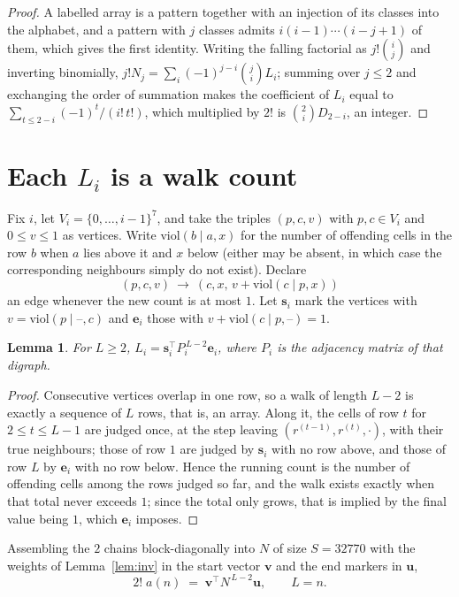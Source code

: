 \documentclass[11pt,a4paper]{article}
\theoremstyle{plain}
\newtheorem{lemma}[theorem]{Lemma}
\theoremstyle{definition}
\begin{document}
\begin{proof}
A labelled array is a pattern together with an injection of its classes into the alphabet,
and a pattern with $j$ classes admits $i(i-1)\cdots(i-j+1)$ of them, which gives the first
identity. Writing the falling factorial as $j!\binom{i}{j}$ and inverting binomially,
$j!N_j=\sum_i(-1)^{j-i}\binom{j}{i}L_i$; summing over $j\le2$ and exchanging the
order of summation makes the coefficient of $L_i$ equal to
$\sum_{t\le2-i}(-1)^t/(i!\,t!)$, which multiplied by $2!$ is
$\binom{2}{i}D_{2-i}$, an integer.
\end{proof}

\section{Each $L_i$ is a walk count}

Fix $i$, let $V_i=\{0,\dots,i-1\}^{7}$, and take the triples $(p,c,v)$ with
$p,c\in V_i$ and $0\le v\le1$ as vertices. Write $\mathrm{viol}(b\mid a,x)$ for the number
of offending cells in the row $b$ when $a$ lies above it and $x$ below (either may be
absent, in which case the corresponding neighbours simply do not exist). Declare
\[
(p,c,v)\ \longrightarrow\ (c,x,\,v+\mathrm{viol}(c\mid p,x))
\]
an edge whenever the new count is at most $1$. Let $\mathbf{s}_i$ mark the vertices with
$v=\mathrm{viol}(p\mid\text{--},c)$ and $\mathbf{e}_i$ those with
$v+\mathrm{viol}(c\mid p,\text{--})=1$.

\begin{lemma}\label{lem:walk}
For $L\ge2$, $L_i=\mathbf{s}_i^{\!\top}P_i^{\,L-2}\mathbf{e}_i$, where $P_i$ is the
adjacency matrix of that digraph.
\end{lemma}

\begin{proof}
Consecutive vertices overlap in one row, so a walk of length $L-2$ is exactly a sequence
of $L$ rows, that is, an array. Along it, the cells of row $t$ for $2\le t\le L-1$ are
judged once, at the step leaving $(r^{(t-1)},r^{(t)},\cdot)$, with their true neighbours;
those of row $1$ are judged by $\mathbf{s}_i$ with no row above, and those of row
$L$ by $\mathbf{e}_i$ with no row below. Hence the running count is the number of
offending cells among the rows judged so far, and the walk exists exactly when that total
never exceeds $1$; since the total only grows, that is implied by the final value being
$1$, which $\mathbf{e}_i$ imposes.
\end{proof}

Assembling the $2$ chains block-diagonally into $N$ of size $S=32770$ with the weights of
Lemma~\ref{lem:inv} in the start vector $\mathbf{v}$ and the end markers in
$\mathbf{u}$,
\begin{equation}\label{eq:walk2}
2!\;a(n)\;=\;\mathbf{v}^{\!\top}N^{\,L-2}\mathbf{u},\qquad L=n .
\end{equation}
\end{document}
